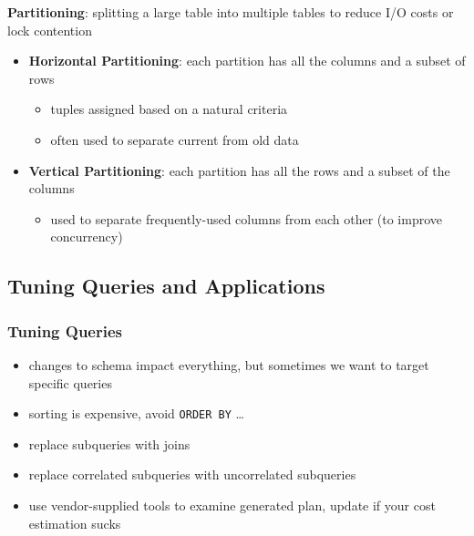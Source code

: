 \documentclass[]{article}
\theoremstyle{definition}
\begin{document}
	\textbf{Partitioning}: splitting a large table into multiple tables to reduce I/O costs or lock contention
	\begin{itemize}
		\item \textbf{Horizontal Partitioning}: each partition has all the columns and a subset of rows
			\begin{itemize}
				\item tuples assigned based on a natural criteria
				\item often used to separate current from old data
			\end{itemize}
		\item \textbf{Vertical Partitioning}: each partition has all the rows and a subset of the columns
			\begin{itemize}
				\item used to separate frequently-used columns from each other (to improve concurrency)
			\end{itemize}
	\end{itemize}

	\subsection{Tuning Queries and Applications}
	\subsubsection{Tuning Queries}
	\begin{itemize}
		\item changes to schema impact everything, but sometimes we want to target specific queries
		\item sorting is expensive, avoid \lstinline|ORDER BY| \dots
		\item replace subqueries with joins
		\item replace correlated subqueries with uncorrelated subqueries
		\item use vendor-supplied tools to examine generated plan, update if your cost estimation sucks
	\end{itemize}
\end{document}
